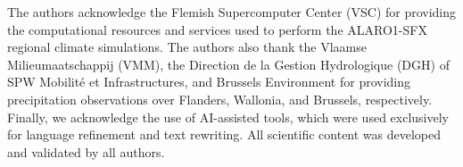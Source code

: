 \documentclass[journal abbreviation, manuscript]{copernicus}
\begin{document}

\begin{acknowledgements}
The authors acknowledge the Flemish Supercomputer Center (VSC) for providing the computational resources and services used to perform the ALARO1-SFX regional climate simulations.
The authors also thank the Vlaamse Milieumaatschappij (VMM), the Direction de la Gestion Hydrologique (DGH) of SPW Mobilité et Infrastructures, and Brussels Environment for providing precipitation observations over Flanders, Wallonia, and Brussels, respectively.
Finally, we acknowledge the use of AI-assisted tools, which were used exclusively for language refinement and text rewriting. All scientific content was developed and validated by all authors.
\end{acknowledgements}












\end{document}
